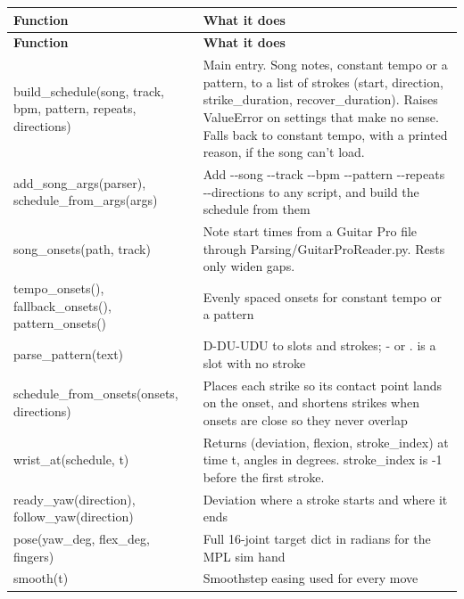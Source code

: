 \documentclass[11pt,letterpaper]{article}
\newcommand{\code}[1]{\textcolor{codeblue}{\ttfamily\smaller\relax #1}}
\begin{document}
{\small
\begin{longtable}{|>{\raggedright\arraybackslash}p{}|>{\raggedright\arraybackslash}p{}|}
\hline
\rowcolor{tblhead}\textbf{Function} & \textbf{What it does} \\ \hline
\endfirsthead
\hline
\rowcolor{tblhead}\textbf{Function} & \textbf{What it does} \\ \hline
\endhead
\code{build\_\allowbreak{}schedule(song,\allowbreak{} track,\allowbreak{} bpm,\allowbreak{} pattern,\allowbreak{} repeats,\allowbreak{} directions)} & Main entry. Song notes, constant tempo or a pattern, to a list of strokes \code{(start,\allowbreak{} direction,\allowbreak{} strike\_\allowbreak{}duration,\allowbreak{} recover\_\allowbreak{}duration)}. Raises \code{ValueError} on settings that make no sense. Falls back to constant tempo, with a printed reason, if the song can't load. \\ \hline
\code{add\_\allowbreak{}song\_\allowbreak{}args(parser)}, \code{schedule\_\allowbreak{}from\_\allowbreak{}args(args)} & Add \code{-{}-{}song -{}-{}track -{}-{}bpm -{}-{}pattern -{}-{}repeats -{}-{}directions} to any script, and build the schedule from them \\ \hline
\code{song\_\allowbreak{}onsets(path,\allowbreak{} track)} & Note start times from a Guitar Pro file through \code{Parsing/\allowbreak{}GuitarProReader.py}. Rests only widen gaps. \\ \hline
\code{tempo\_\allowbreak{}onsets()}, \code{fallback\_\allowbreak{}onsets()}, \code{pattern\_\allowbreak{}onsets()} & Evenly spaced onsets for constant tempo or a pattern \\ \hline
\code{parse\_\allowbreak{}pattern(text)} & \code{\textquotedbl{}D-{}\allowbreak{}DU-{}\allowbreak{}UDU\textquotedbl{}} to slots and strokes; \code{-{}} or \code{.} is a slot with no stroke \\ \hline
\code{schedule\_\allowbreak{}from\_\allowbreak{}onsets(onsets,\allowbreak{} directions)} & Places each strike so its contact point lands on the onset, and shortens strikes when onsets are close so they never overlap \\ \hline
\code{wrist\_\allowbreak{}at(schedule,\allowbreak{} t)} & Returns \code{(deviation,\allowbreak{} flexion,\allowbreak{} stroke\_\allowbreak{}index)} at time t, angles in degrees. \code{stroke\_\allowbreak{}index} is -1 before the first stroke. \\ \hline
\code{ready\_\allowbreak{}yaw(direction)}, \code{follow\_\allowbreak{}yaw(direction)} & Deviation where a stroke starts and where it ends \\ \hline
\code{pose(yaw\_\allowbreak{}deg,\allowbreak{} flex\_\allowbreak{}deg,\allowbreak{} fingers)} & Full 16-joint target dict in radians for the MPL sim hand \\ \hline
\code{smooth(t)} & Smoothstep easing used for every move \\ \hline
\end{longtable}}
\end{document}
